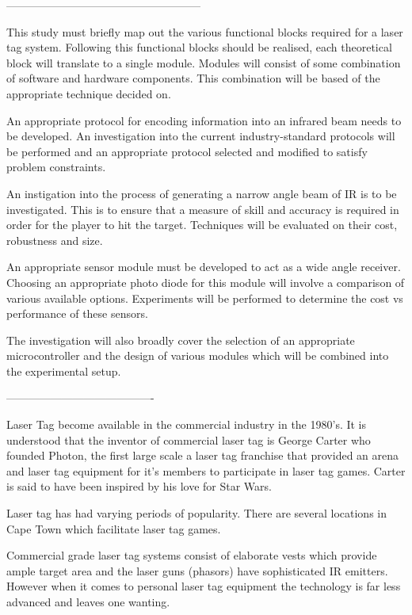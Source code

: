 -----------------------------------------------------

This study must briefly map out the various functional blocks required for a laser tag system. Following this functional blocks should be realised, each theoretical block will translate to a single module. Modules will consist of some combination of software and hardware components. This combination will be based of the appropriate technique decided on.

An appropriate protocol for encoding information into an infrared beam needs to be developed. An investigation into the current industry-standard protocols will be performed and an appropriate protocol selected and modified to satisfy problem constraints.

An instigation into the process of generating a narrow angle beam of IR is to be investigated. This is to ensure that a measure of skill and accuracy is required in order for the player to hit the target. Techniques will be evaluated on their cost, robustness and size.

An appropriate sensor module must be developed to act as a wide angle receiver. Choosing an appropriate photo diode for this module will involve a comparison of various available options. Experiments will be performed to determine the cost vs performance of these sensors.

The investigation will also broadly cover the selection of an appropriate microcontroller and the design of various modules which will be combined into the experimental setup.

----------------------------------------

Laser Tag become available in the commercial industry in the 1980's. It is understood that the inventor of commercial laser tag is George Carter who founded Photon, the first large scale a laser tag franchise that provided an arena and laser tag equipment for it's members to participate in laser tag games. Carter is said to have been inspired by his love for Star Wars.

Laser tag has had varying periods of popularity.
There are several locations in Cape Town which facilitate laser tag games.

Commercial grade laser tag systems consist of elaborate vests which provide ample target area and the laser guns (phasors) have sophisticated IR emitters. However when it comes to personal laser tag equipment the technology is far less advanced and leaves one wanting.


